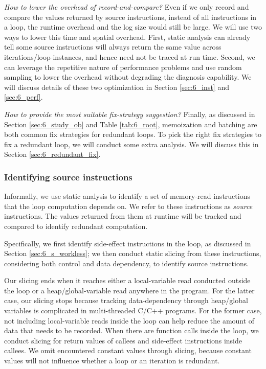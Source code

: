 \emph{How to lower the overhead of record-and-compare?}
Even if we only record and compare the values returned by source instructions,
instead of all instructions in a loop, the runtime overhead and the log size
would still be large. We will use two ways to lower this time and spatial
overhead. First, static analysis can already tell some source instructions
will always return the same value across iterations/loop-instances, and hence
need not be traced at run time. Second, we can leverage the repetitive nature
of performance problems and use random sampling to lower the overhead without
degrading the diagnosis capability. We will discuss details of 
these two optimization in Section \ref{sec:6_inst} and \ref{sec:6_perf}.

\emph{How to provide the most suitable fix-strategy suggestion?}
Finally, as discussed in Section \ref{sec:6_study_ob} and Table \ref{tab:6_root},
memoization and batching are both common fix strategies for redundant loops.
To pick the right fix strategies to fix a redundant loop, we will conduct 
some extra analysis. We will discuss this in Section \ref{sec:6_redundant_fix}.


\subsubsection{Identifying source instructions}
\label{sec:6_dependence}

Informally, we use static analysis to identify a set of 
memory-read instructions that the loop computation depends on. We refer
to these instructions as \textit{source} instructions. The values returned
from them at runtime will be tracked and compared to identify
redundant computation.

Specifically, we first identify side-effect instructions in the loop, as 
discussed in Section \ref{sec:6_s_workless}; we then conduct static slicing 
from these instructions, considering both control and data
dependency, to identify source instructions.

Our slicing ends when it reaches either a local-variable read conducted
outside the loop or a heap/global-variable read anywhere in the program.
For the latter case, our slicing stops because tracking data-dependency
through heap/global variables is complicated in multi-threaded C/C++
programs. For the former case, 
not including local-variable reads inside the loop can help reduce the
amount of data that needs to be recorded. 
When there are function calls inside the loop,  
we conduct slicing for return values of callees and side-effect instructions
inside callees. 
We omit encountered constant values through slicing, because constant values will not influence whether a loop or an iteration is redundant. 


